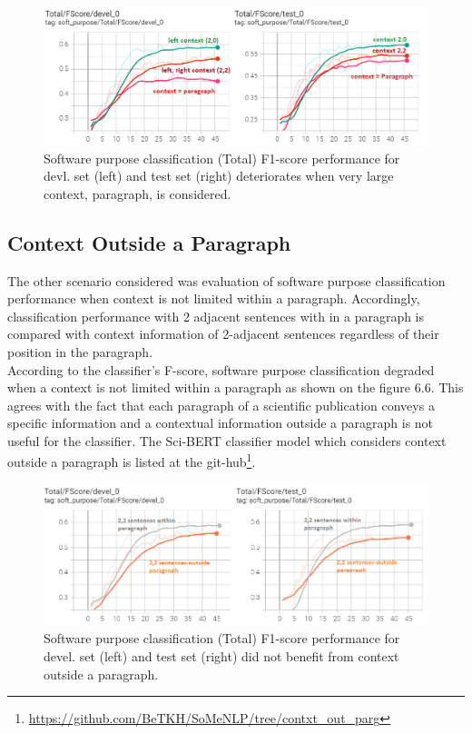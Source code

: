 \begin{figure}[htbp]
	\centering
	\includegraphics[width=.90\textwidth]{4.graphics/figures/ch_6/2.left_context_vs_right/HD/context_paragrapgh}
	\caption{Software purpose classification (Total) F1-score performance for devl. set (left) and test set (right) deteriorates when very large context, paragraph, is considered.}
	\label{fig:chapter06:whole_par}
\end{figure}


\subsection{Context Outside a Paragraph}
\label{sec:chapter06:contxtOutside}


The other scenario considered was evaluation of software purpose classification performance when context is not limited within a paragraph. Accordingly, classification performance with 2 adjacent sentences with in a paragraph is compared with context information of 2-adjacent sentences regardless of their position in the paragraph. \\

According to the classifier's F-score, software purpose classification degraded when a context is not limited within a paragraph as shown on the figure 6.6. This agrees with the fact that each paragraph of a scientific publication conveys a specific information and a contextual information outside a paragraph is not useful for the classifier.  The Sci-BERT classifier model which considers context outside a paragraph is listed at the git-hub\footnote{\url{https://github.com/BeTKH/SoMeNLP/tree/contxt_out_parg}}. \\

\begin{figure}[htbp]
	\centering
	\includegraphics[width=.80\textwidth]{4.graphics/figures/ch_6/2.left_context_vs_right/HD/Fscore_outside_paragrapgh_vs_inside}
	\caption{Software purpose classification (Total) F1-score performance for devel. set (left) and test set (right) did not benefit from context outside a paragraph. }
	\label{fig:chapter06:with}
\end{figure}


